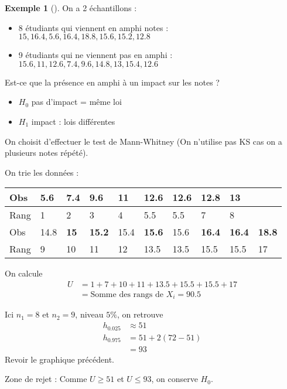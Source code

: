 \documentclass{article}
\theoremstyle{plain}%
\theoremstyle{definition}
\newtheorem{exmp}{Exemple}[section]
\theoremstyle{remark}
\begin{document}
\begin{exmp}[]
    On a 2 échantillons : \begin{itemize}
        \item 8 étudiants qui viennent en amphi notes : $ 15, 16.4, 5.6, 16.4, 18.8, 15.6, 15.2, 12.8 $ 
        \item 9 étudiants qui ne viennent pas en amphi : $ 15.6, 11, 12.6, 7.4, 9.6, 14.8, 13, 15.4, 12.6 $ 
    \end{itemize}
    Est-ce que la présence en amphi à un impact sur les notes ? \begin{itemize}
        \item $ H_0 $ pas d'impact = même loi
        \item $ H_1 $ impact : lois différentes
    \end{itemize}
    On choisit d'effectuer le test de Mann-Whitney (On n'utilise pas KS cas on a plusieurs notes répété). 

    On trie les données :
    \begin{table}[!ht]
        \centering
        \begin{tabular}{|l|l|l|l|l|l|l|l|l|l|}
        \hline
            Obs & \textbf{5.6} & 7.4 & 9.6 & 11 & 12.6 & 12.6 & \textbf{12.8} & 13 &  \\ \hline
            Rang & 1 & 2 & 3 & 4 & 5.5 & 5.5 & 7 & 8 &  \\ \hline
            Obs & 14.8 & \textbf{15} & \textbf{15.2} & 15.4 & \textbf{15.6} & 15.6 & \textbf{16.4} & \textbf{16.4} & \textbf{18.8} \\ \hline
            Rang & 9 & 10 & 11 & 12 & 13.5 & 13.5 & 15.5 & 15.5 & 17 \\ \hline
        \end{tabular}
    \end{table}

    On calcule
    \begin{align*}
        U &= 1 + 7 + 10 + 11 + 13.5 + 15.5 + 15.5 + 17 \\ 
            &= \text{Somme des rangs de } X_i = 90.5
    \end{align*}

    Ici $ n_1 = 8 $ et $ n_2 = 9 $, niveau $ 5\% $, on retrouve
    \begin{align*}
        h_{0.025} &\approx 51 \\
        h_{0.975} &= 51 + 2(72 - 51) \\
            &= 93
    \end{align*}
    Revoir le graphique précédent. 

    Zone de rejet : Comme $ U \geq 51 $ et $ U \leq 93 $, on conserve $ H_0 $.
\end{exmp}
\end{document}
